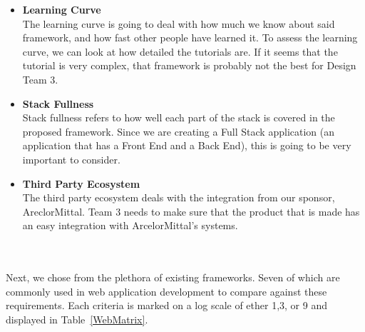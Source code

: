 \documentclass[Letter,11pt]{article}
\begin{document}
		\begin{minipage}[t]{0.5\textwidth}
		\begin{itemize}
			\item \textbf{Learning Curve} \\
			The learning curve is going to deal with how much we know about said framework, and how fast other people have learned it. To assess the learning curve, we can look at how detailed the tutorials are. If it seems that the tutorial is very complex, that framework is probably not the best for Design Team 3. 


			\item \textbf{Stack Fullness} \\
			Stack fullness refers to how well each part of the stack is covered in the proposed framework. Since we are creating a Full Stack application (an application that has a Front End and a Back End), this is going to be very important to consider.

			\item \textbf{Third Party Ecosystem}\\
			The third party ecosystem deals with the integration from our sponsor, AreclorMittal. Team 3 needs to make sure that the product that is made has an easy integration with ArcelorMittal's systems. 
			
		\end{itemize}
		\end{minipage}\\
		\\

		Next, we chose from the plethora of existing frameworks. Seven of which are commonly used in web application development to compare against these requirements. Each criteria is marked on a log scale of ether 1,3, or 9 and displayed in Table~\ref{WebMatrix}.
		
\end{document}
